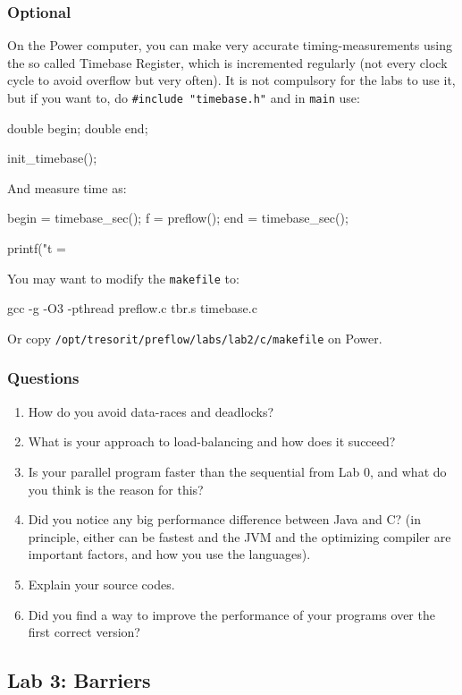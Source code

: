 \documentclass{forsete}
\begin{document}
\subsubsection*{Optional}
On the Power computer, you can make very accurate timing-measurements using the so called Timebase Register, 
which is incremented regularly (not every clock cycle to avoid overflow but very often).
It is not compulsory for the labs to use it, but if you want to, do \verb!#include "timebase.h"! and in \verb.main. use: 
\begin{ccode}
	double		begin;
	double		end;

        init_timebase();
\end{ccode}
And measure time as:
\begin{ccode}
	begin = timebase_sec();
        f = preflow();
        end = timebase_sec();

        printf("t = %
\end{ccode}
You may want to modify the \verb.makefile. to:
\begin{ccode}
gcc -g -O3 -pthread preflow.c tbr.s timebase.c
\end{ccode}
Or copy \verb!/opt/tresorit/preflow/labs/lab2/c/makefile! on Power.

\subsubsection*{Questions}
\begin{enumerate}
\item How do you avoid data-races and deadlocks? 
\item What is your approach to load-balancing and how does it succeed?
\item Is your parallel program faster than the sequential from Lab 0, and
what do you think is the reason for this?
\item Did you notice any big performance difference between Java and C? (in principle, either can be fastest and 
the JVM and the optimizing compiler are important factors, and how you use the languages).
\item Explain your source codes.
\item Did you find a way to improve the performance of your programs over the first correct version?

\end{enumerate}

\newpage
\subsection*{Lab 3: Barriers}
\end{document}

